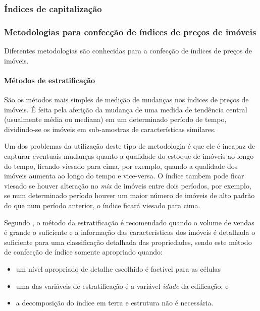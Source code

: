 \documentclass[
	12pt,				%
	oneside,			%
	a4paper,			%
	chapter=TITLE,		%
	section=TITLE,		%
	english,			%
	brazil				%
	]{abntex2}
\begin{document}
\subsubsection{Índices de
capitalização}\label{uxedndices-de-capitalizauxe7uxe3o}

\subsubsection{Metodologias para confecção de índices de preços de
imóveis}\label{metodologias-para-confecuxe7uxe3o-de-uxedndices-de-preuxe7os-de-imuxf3veis}

Diferentes metodologias são conhecidas para a confecção de índices de
preços de imóveis.

\paragraph{Métodos de
estratificação}\label{muxe9todos-de-estratificauxe7uxe3o}

São os métodos mais simples de medição de mudanças nos índices de preços
de imóveis. É feita pela aferição da mudança de uma medida de tendência
central (usualmente média ou mediana) em um determinado período de
tempo, dividindo-se os imóveis em sub-amostras de características
similares.

Um dos problemas da utilização deste tipo de metodologia é que ele é
incapaz de capturar eventuais mudanças quanto a qualidade do estoque de
imóveis ao longo do tempo, ficando viesado para cima, por exemplo,
quando a qualidade dos imóveis aumenta ao longo do tempo e vice-versa. O
índice tambem pode ficar viesado se houver alteração no \emph{mix} de
imóveis entre dois períodos, por exemplo, se num determinado período
houver um maior número de imóveis de alto padrão do que num período
anterior, o índice ficará viesado para cima.

Segundo \textcites{rppi}[158]{rppi}, o método da estratificação é
recomendado quando o volume de vendas é grande o suficiente e a
informação das características dos imóveis é detalhada o suficiente para
uma classificação detalhada das propriedades, sendo este método de
confecção de índice somente apropriado quando:
\begin{itemize}
\tightlist
\item
  um nível apropriado de detalhe escolhido é factível para as células
\item
  uma das variáveis de estratificação é a variável \emph{idade} da
  edificação; e
\item
  a decomposição do índice em terra e estrutura não é necessária.
\end{itemize}
\end{document}
